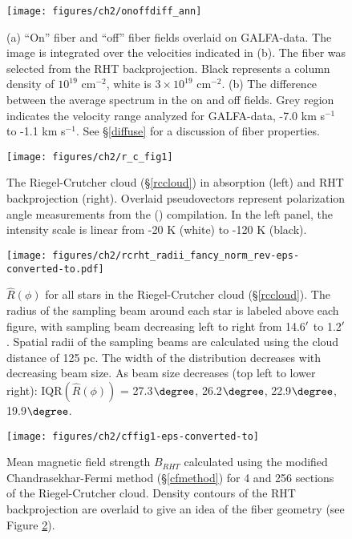 \begin{figure*}[h!]
\centering
\texttt{[image: figures/ch2/onoffdiff\_ann]}
\caption{(a) ``On'' fiber and ``off'' fiber fields overlaid on GALFA-\hi data. The image is integrated over the velocities indicated in (b). The fiber was selected from the RHT backprojection. Black represents a column density of $10^{19}$ cm$^{-2}$, white is $3 \times 10^{19}$ cm$^{-2}$. (b) The difference between the average spectrum in the on and off fields. Grey region indicates the velocity range analyzed for GALFA-\hi data, -7.0 km s$^{-1}$ to -1.1 km s$^{-1}$. See \S\ref{diffuse} for a discussion of fiber properties.}
\label{onoff}
\end{figure*}

\begin{figure*}[t!]
\centering
\texttt{[image: figures/ch2/r\_c\_fig1]}
\caption{The Riegel-Crutcher cloud (\S\ref{rccloud}) in \hi absorption (left) and RHT backprojection (right). Overlaid pseudovectors represent polarization angle measurements from the \citeauthor{Heiles:2000un} (\citeyear{Heiles:2000un}) compilation. In the left panel, the intensity scale is linear from -20 K (white) to -120 K (black).}
\label{rccloudfig}
\end{figure*}

\begin{figure}[bp]
\texttt{[image: figures/ch2/rcrht\_radii\_fancy\_norm\_rev-eps-converted-to.pdf]}
\caption{${\hat{R}\left(\phi\right)}$ for all stars in the Riegel-Crutcher cloud (\S\ref{rccloud}). The radius of the sampling beam around each star is labeled above each figure, with sampling beam decreasing left to right from 14.6${\mbox{$^\prime$}}$ to 1.2${\mbox{$^\prime$}}$. Spatial radii of the sampling beams are calculated using the cloud distance of 125 pc. The width of the distribution decreases with decreasing beam size. As beam size decreases (top left to lower right): IQR$(\hat{R}\left(\phi\right))$ = 27.3$\degree$, 26.2$\degree$, 22.9$\degree$, 19.9$\degree$.}
\label{rcbeams}
\end{figure}

\begin{figure*}
\centering
\texttt{[image: figures/ch2/cffig1-eps-converted-to]}
\caption{Mean magnetic field strength ${B_{RHT}}$ calculated using the modified Chandrasekhar-Fermi method (\S\ref{cfmethod}) for 4 and 256 sections of the Riegel-Crutcher cloud. Density contours of the RHT backprojection are overlaid to give an idea of the fiber geometry (see Figure \ref{rccloudfig}).}
\label{cfcloudfig}
\end{figure*}


